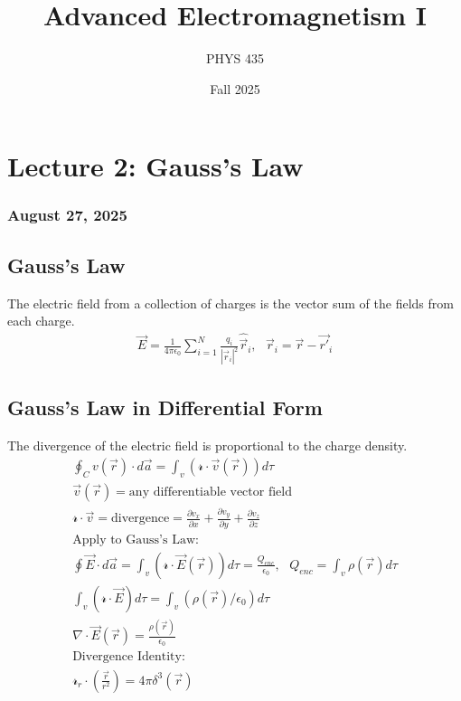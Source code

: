 \documentclass{article}
\title{Advanced Electromagnetism I}
\author{PHYS 435}
\date{Fall 2025}
\begin{document}
\maketitle

\newpage
\tableofcontents

\newpage
\section{Lecture 2: Gauss's Law}
\subsubsection*{August 27, 2025}

\subsection{Gauss's Law}
\begin{conceptbox}
The electric field from a collection of charges is the vector sum of the fields from each charge.
\begin{align*}
    \vec{E} = \frac{1}{4\pi\epsilon_0}\sum_{i=1}^N \frac{q_i}{|\vec{r}_i|^2} \hat{\vec{r}}_i,\text{ } \vec{r}_i=\vec{r}-\vec{r'}_i
\end{align*}
\end{conceptbox}

\subsection{Gauss's Law in Differential Form}
\begin{conceptbox}
The divergence of the electric field is proportional to the charge density.
\begin{align*}
    \oint_C v(\vec{r}) \cdot d\vec{a} = \int_v (\mathcal{r}\cdot\vec{v}(\vec{r}))d\tau \\
    \vec{v}(\vec{r}) = \text{any differentiable vector field} \\
    \mathcal{r}\cdot\vec{v} = \text{divergence} = \frac{\partial v_x}{\partial x} + \frac{\partial v_y}{\partial y} + \frac{\partial v_z}{\partial z} \\
    \text{Apply to Gauss's Law}: \\
    \oint \vec{E} \cdot d\vec{a} = \int_v (\mathcal{r}\cdot\vec{E}(\vec{r}))d\tau = \frac{Q_{enc}}{\epsilon_0}, \text{ } Q_{enc} = \int_v \rho(\vec{r})d\tau \\
    \int_v(\mathcal{r}\cdot\vec{E})d\tau = \int_v(\rho(\vec{r})/\epsilon_0)d\tau \\
    \nabla\cdot\vec{E}(\vec{r}) = \frac{\rho(\vec{r})}{\epsilon_0} \\
    \text{Divergence Identity: }\\
    \mathcal{r}_r\cdot(\frac{\vec{r}}{r^2}) = 4\pi\delta^3(\vec{r}) \\
\end{align*}
\end{conceptbox}
\end{document}

